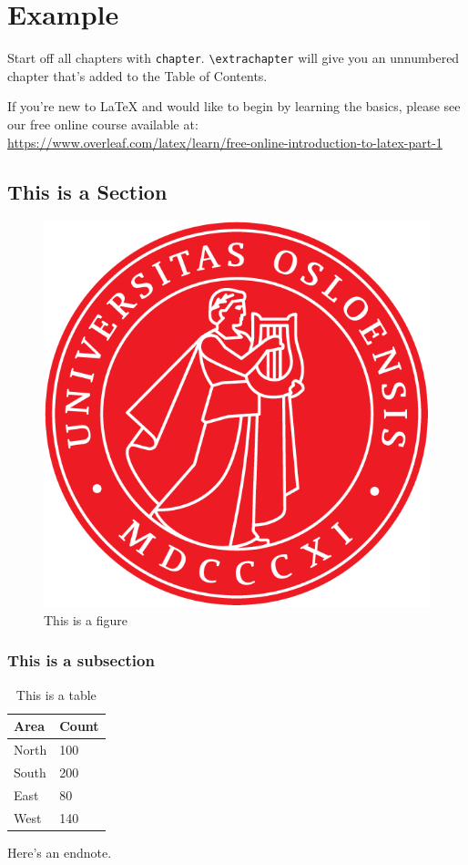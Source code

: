 \chapter{Example}


Start off all chapters with \verb|chapter|.  \verb|\extrachapter| will give you an unnumbered chapter that's added to the Table of Contents. 


If you're new to \LaTeX{} and would like to begin by learning the basics, please see our free online course available at:\\ \url{https://www.overleaf.com/latex/learn/free-online-introduction-to-latex-part-1} 


\section{This is a Section}

\begin{figure}[hbt!]
\centering
\includegraphics[width=.3\textwidth]{uio.png}
\caption{This is a figure}\label{fig:logo}
\end{figure}

\subsection{This is a subsection}

\begin{table}[hbt!]
\centering
\begin{tabular}{ll}
\hline
Area & Count\\
\hline
North & 100\\
South & 200\\
East & 80\\
West & 140\\
\hline
\end{tabular}
\caption{This is a table}
\label{tab:sample}
\end{table}


Here's an endnote.


